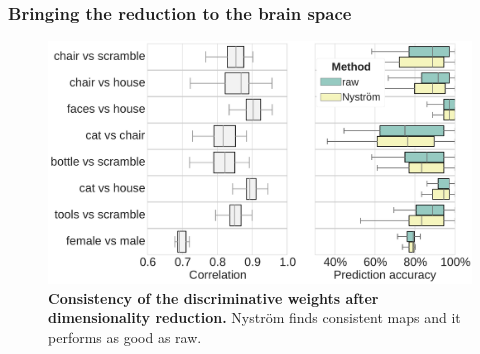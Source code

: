\documentclass{beamer}
\begin{document}
\begin{frame}\frametitle{\textbf{Bringing the reduction to the brain space}}
\begin{figure}
\centering
\includegraphics[width=1\linewidth]{figures/correlation.pdf}
\caption{\textbf{Consistency of the discriminative weights after dimensionality 
reduction.} Nystr\"om finds consistent maps and it performs as good as raw.}
\end{figure}
\end{frame}
\end{document}
